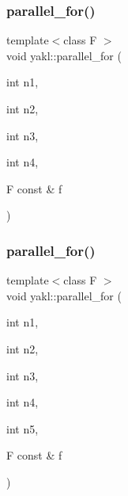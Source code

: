 \mbox{\label{namespaceyakl_a17a0fe52b5f35cc9d16a7d057b304b81}} 
\subsubsection{\texorpdfstring{parallel\+\_\+for()}{parallel\_for()}\hspace{0.1cm}{\footnotesize\ttfamily [4/16]}}
{\footnotesize\ttfamily template$<$class F $>$ \\
void yakl\+::parallel\+\_\+for (\begin{DoxyParamCaption}\item[{int}]{n1,  }\item[{int}]{n2,  }\item[{int}]{n3,  }\item[{int}]{n4,  }\item[{F const \&}]{f }\end{DoxyParamCaption})\hspace{0.3cm}{\ttfamily [inline]}}

\mbox{\label{namespaceyakl_a96e9f12fb9431492fd92e518c540fe81}} 
\subsubsection{\texorpdfstring{parallel\+\_\+for()}{parallel\_for()}\hspace{0.1cm}{\footnotesize\ttfamily [5/16]}}
{\footnotesize\ttfamily template$<$class F $>$ \\
void yakl\+::parallel\+\_\+for (\begin{DoxyParamCaption}\item[{int}]{n1,  }\item[{int}]{n2,  }\item[{int}]{n3,  }\item[{int}]{n4,  }\item[{int}]{n5,  }\item[{F const \&}]{f }\end{DoxyParamCaption})\hspace{0.3cm}{\ttfamily [inline]}}

\mbox{\label{namespaceyakl_a9475cbfb86a88937c4b6a4cf253467f4}} 
